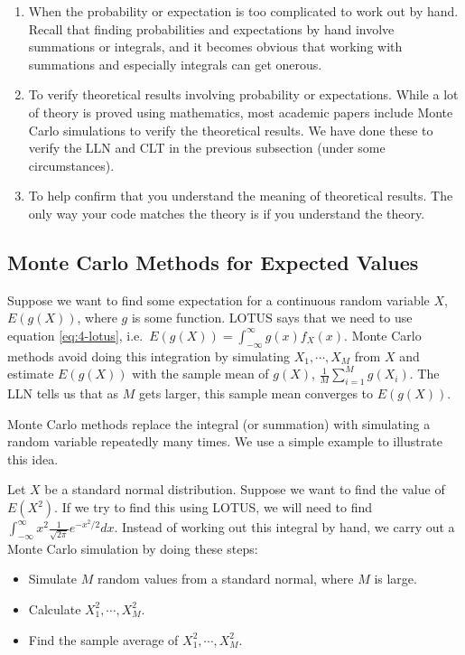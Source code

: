 \documentclass[
]{book}
\providecommand{\tightlist}{%
  \setlength{\itemsep}{0pt}\setlength{\parskip}{0pt}}
\begin{document}
\begin{enumerate}
\def\labelenumi{\arabic{enumi}.}
\item
  When the probability or expectation is too complicated to work out by hand. Recall that finding probabilities and expectations by hand involve summations or integrals, and it becomes obvious that working with summations and especially integrals can get onerous.
\item
  To verify theoretical results involving probability or expectations. While a lot of theory is proved using mathematics, most academic papers include Monte Carlo simulations to verify the theoretical results. We have done these to verify the LLN and CLT in the previous subsection (under some circumstances).
\item
  To help confirm that you understand the meaning of theoretical results. The only way your code matches the theory is if you understand the theory.
\end{enumerate}

\subsection{Monte Carlo Methods for Expected Values}\label{monte-carlo-methods-for-expected-values}

Suppose we want to find some expectation for a continuous random variable \(X\), \(E(g(X))\), where \(g\) is some function. LOTUS says that we need to use equation \eqref{eq:4-lotus}, i.e.~\(E(g(X)) = \int_{-\infty}^{\infty} g(x) f_X(x).\) Monte Carlo methods avoid doing this integration by simulating \(X_1, \cdots, X_M\) from \(X\) and estimate \(E(g(X))\) with the sample mean of \(g(X)\), \(\frac{1}{M} \sum_{i=1}^M g(X_i)\). The LLN tells us that as \(M\) gets larger, this sample mean converges to \(E(g(X))\).

Monte Carlo methods replace the integral (or summation) with simulating a random variable repeatedly many times. We use a simple example to illustrate this idea.

Let \(X\) be a standard normal distribution. Suppose we want to find the value of \(E(X^2)\). If we try to find this using LOTUS, we will need to find \(\int_{-\infty}^{\infty} x^2 \frac{1}{\sqrt{2 \pi}} e^{-x^2/2} dx\). Instead of working out this integral by hand, we carry out a Monte Carlo simulation by doing these steps:

\begin{itemize}
\tightlist
\item
  Simulate \(M\) random values from a standard normal, where \(M\) is large.
\item
  Calculate \(X_1^2, \cdots, X_M^2\).
\item
  Find the sample average of \(X_1^2, \cdots, X_M^2\).
\end{itemize}
\end{document}
